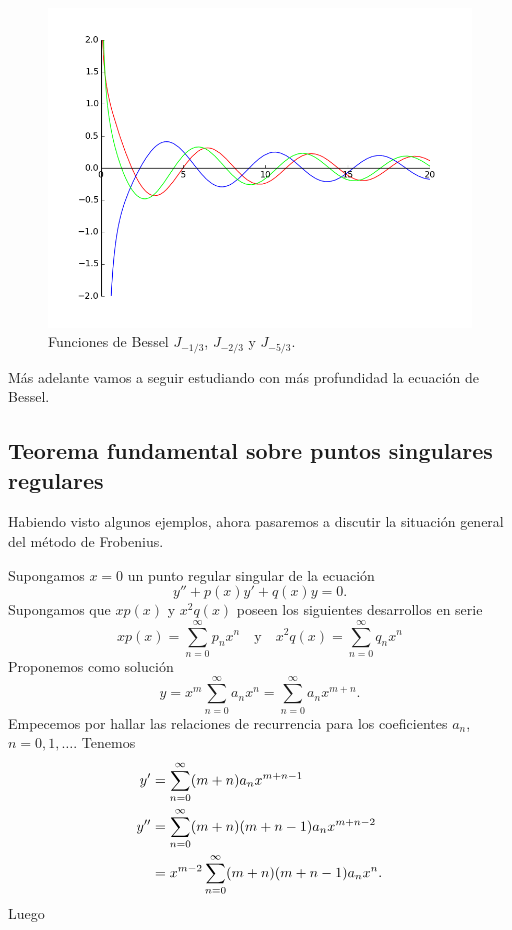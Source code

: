\begin{figure}[h]
\begin{center}
\includegraphics[scale=.5]{imagenes/bessel2.png}
\end{center}
\caption{Funciones de Bessel $J_{-1/3}$, $J_{-2/3}$ y $J_{-5/3}$.}
\end{figure}
Más adelante vamos a seguir estudiando con más profundidad la ecuación de Bessel.

\subsection{Teorema fundamental sobre puntos singulares regulares}\label{eq:sec_teor_fund_frob}
Habiendo visto algunos ejemplos, ahora pasaremos a discutir la situación general del método de Frobenius.

Supongamos $x=0$ un punto regular singular de la ecuación
\begin{equation}\label{eq:dif_2_orden} y''+p(x)y'+q(x)y=0.
\end{equation}
Supongamos que $xp(x)$ y $x^2q(x)$ poseen los  siguientes desarrollos en serie
\[xp(x)=\sum_{n=0}^{\infty}p_nx^n\quad\text{y}\quad x^2q(x)=\sum_{n=0}^{\infty}q_nx^n\]
Proponemos como solución
\[y=x^{m}\sum_{n=0}^{\infty}a_nx^n=\sum_{n=0}^{\infty}a_nx^{m+n}.\]
Empecemos por hallar las relaciones de recurrencia para los coeficientes $a_n$, $n=0,1,\ldots$.   Tenemos
\begin{subequations}
    \begin{align}
      y'&=\sum_{n=0}^{\infty}(m+n)a_{n}x^{m+n-1}\\
      y''&=\sum_{n=0}^{\infty}(m+n)(m+n-1)a_{n}x^{m+n-2}\notag\\
&=x^{m-2}\sum_{n=0}^{\infty}(m+n)(m+n-1)a_{n}x^{n}\label{eq:der_seg} .
    \end{align}
  \end{subequations}
Luego

